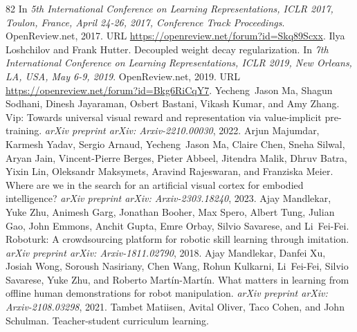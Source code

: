 \documentclass{article}
\begin{document}
\begin{thebibliography}{82}
\newblock In \emph{5th International Conference on Learning Representations, {ICLR} 2017, Toulon, France, April 24-26, 2017, Conference Track Proceedings}. OpenReview.net, 2017.
\newblock URL \url{https://openreview.net/forum?id=Skq89Scxx}.
Ilya Loshchilov and Frank Hutter.
\newblock Decoupled weight decay regularization.
\newblock In \emph{7th International Conference on Learning Representations, {ICLR} 2019, New Orleans, LA, USA, May 6-9, 2019}. OpenReview.net, 2019.
\newblock URL \url{https://openreview.net/forum?id=Bkg6RiCqY7}.
Yecheng~Jason Ma, Shagun Sodhani, Dinesh Jayaraman, Osbert Bastani, Vikash Kumar, and Amy Zhang.
\newblock Vip: Towards universal visual reward and representation via value-implicit pre-training.
\newblock \emph{arXiv preprint arXiv: Arxiv-2210.00030}, 2022.
Arjun Majumdar, Karmesh Yadav, Sergio Arnaud, Yecheng~Jason Ma, Claire Chen, Sneha Silwal, Aryan Jain, Vincent-Pierre Berges, Pieter Abbeel, Jitendra Malik, Dhruv Batra, Yixin Lin, Oleksandr Maksymets, Aravind Rajeswaran, and Franziska Meier.
\newblock Where are we in the search for an artificial visual cortex for embodied intelligence?
\newblock \emph{arXiv preprint arXiv: Arxiv-2303.18240}, 2023.
Ajay Mandlekar, Yuke Zhu, Animesh Garg, Jonathan Booher, Max Spero, Albert Tung, Julian Gao, John Emmons, Anchit Gupta, Emre Orbay, Silvio Savarese, and Li~Fei-Fei.
\newblock Roboturk: A crowdsourcing platform for robotic skill learning through imitation.
\newblock \emph{arXiv preprint arXiv: Arxiv-1811.02790}, 2018.
Ajay Mandlekar, Danfei Xu, Josiah Wong, Soroush Nasiriany, Chen Wang, Rohun Kulkarni, Li~Fei-Fei, Silvio Savarese, Yuke Zhu, and Roberto Martín-Martín.
\newblock What matters in learning from offline human demonstrations for robot manipulation.
\newblock \emph{arXiv preprint arXiv: Arxiv-2108.03298}, 2021.
Tambet Matiisen, Avital Oliver, Taco Cohen, and John Schulman.
\newblock Teacher-student curriculum learning.

\end{thebibliography}
\end{document}
